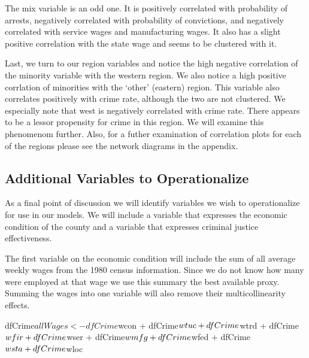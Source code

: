 \documentclass[]{article}
\newenvironment{Shaded}{}{}
\newcommand{\NormalTok}[1]{#1}
\newcommand{\OperatorTok}[1]{#1}
\newcommand{\StringTok}[1]{\textcolor[rgb]{0.00,0.50,0.50}{#1}}
\begin{document}
The mix variable is an odd one. It is positively correlated with
probability of arrests, negatively correlated with probability of
convictions, and negatively correlated with service wages and
manufacturing wages. It also has a slight positive correlation with the
state wage and seems to be clustered with it.

Last, we turn to our region variables and notice the high negative
correlation of the minority variable with the western region. We also
notice a high positive corrlation of minorities with the `other'
(eastern) region. This variable also correlates positively with crime
rate, although the two are not clustered. We especially note that west
is negatively correlated with crime rate. There appears to be a lessor
propensity for crime in this region. We will examine this phenomenom
further. Also, for a futher examination of correlation plots for each of
the regions please see the network diagrams in the appendix.

\hypertarget{additional-variables-to-operationalize}{%
\subsection{Additional Variables to
Operationalize}\label{additional-variables-to-operationalize}}

As a final point of discussion we will identify variables we wish to
operationalize for use in our models. We will include a variable that
expresses the economic condition of the county and a variable that
expresses criminal justice effectiveness.

The first variable on the economic condition will include the sum of all
average weekly wages from the 1980 census information. Since we do not
know how many were employed at that wage we use this summary the best
available proxy. Summing the wages into one variable will also remove
their multicollinearity effects.

\begin{Shaded}
\begin{Highlighting}[]
\NormalTok{dfCrime}\OperatorTok{$}\NormalTok{allWages<-dfCrime}\OperatorTok{$}\NormalTok{wcon }\OperatorTok{+}\StringTok{ }\NormalTok{dfCrime}\OperatorTok{$}\NormalTok{wtuc }\OperatorTok{+}\StringTok{ }\NormalTok{dfCrime}\OperatorTok{$}\NormalTok{wtrd }\OperatorTok{+}\StringTok{ }\NormalTok{dfCrime}\OperatorTok{$}\NormalTok{wfir }\OperatorTok{+}
\StringTok{    }\NormalTok{dfCrime}\OperatorTok{$}\NormalTok{wser }\OperatorTok{+}\StringTok{ }\NormalTok{dfCrime}\OperatorTok{$}\NormalTok{wmfg }\OperatorTok{+}\StringTok{ }\NormalTok{dfCrime}\OperatorTok{$}\NormalTok{wfed }\OperatorTok{+}\StringTok{ }\NormalTok{dfCrime}\OperatorTok{$}\NormalTok{wsta }\OperatorTok{+}\StringTok{ }\NormalTok{dfCrime}\OperatorTok{$}\NormalTok{wloc}
\end{Highlighting}
\end{Shaded}
\end{document}
